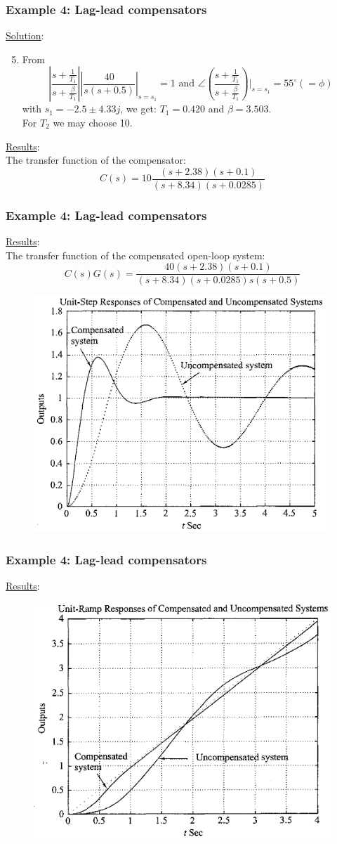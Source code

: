 \begin{frame}
	\frametitle{Example 4: Lag-lead compensators}
	\underline{Solution}:
	\begin{enumerate}
		\setcounter{enumi}{4}
		\item From
		$$|\frac{s+\frac{1}{T_1}}{s+\frac{\beta}{T_1}}||\frac{40}{s(s+0.5)}|_{s=s_1}=1 \text{ and } \angle\left(\frac{s+\frac{1}{T_1}}{s+\frac{\beta}{T_1}}\right)|_{s=s_1}=55^{\circ}(=\phi)$$
		with $s_1=-2.5\pm 4.33j$,
		we get: $T_1=0.420$ and $\beta=3.503$.\\
		For $T_2$ we may choose 10.
	\end{enumerate}
	\underline{Results}:\\
	The transfer function of the compensator:
	$$C(s)=10\frac{(s+2.38)(s+0.1)}{(s+8.34)(s+0.0285)}$$
\end{frame}

\begin{frame}
	\frametitle{Example 4: Lag-lead compensators}
	\underline{Results}:\\
	The transfer function of the compensated open-loop system:
	$$C(s)G(s)=\frac{40(s+2.38)(s+0.1)}{(s+8.34)(s+0.0285)s(s+0.5)}$$
	\begin{figure}
		\centering
		\includegraphics[width=0.48\linewidth]{Ex4_response}
	\end{figure}
\end{frame}

\begin{frame}
	\frametitle{Example 4: Lag-lead compensators}
	\underline{Results}:
	\begin{figure}
		\centering
		\includegraphics[width=0.7\linewidth]{Ex4_ramp}
	\end{figure}
\end{frame}

